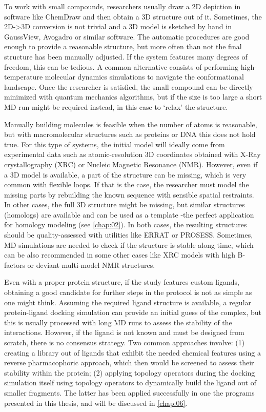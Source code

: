 To work with small compounds, researchers usually draw a 2D depiction in software like ChemDraw\cite{chemdraw} and then obtain a 3D structure out of it. Sometimes, the 2D->3D conversion is not trivial and a 3D model is sketched by hand in GaussView,\cite{gaussview} Avogadro\cite{avogadro} or similar software. The automatic procedures are good enough to provide a reasonable structure, but more often than not the final structure has been manually adjusted. If the system features many degrees of freedom, this can be tedious. A common alternative consists of performing high-temperature molecular dynamics simulations to navigate the conformational landscape. Once the researcher is satisfied, the small compound can be directly minimized with quantum mechanics algorithms, but if the size is too large a short MD run might be required instead, in this case to ‘relax’ the structure.

Manually building molecules is feasible when the number of atoms is reasonable, but with macromolecular structures such as proteins or DNA this does not hold true. For this type of systems, the initial model will ideally come from experimental data such as atomic-resolution 3D coordinates obtained with X-Ray crystallography (XRC) or Nucleic Magnetic Resonance (NMR). However, even if a 3D model is available, a part of the structure can be missing, which is very common with flexible loops. If that is the case, the researcher must model the missing parts by rebuilding the known sequence with sensible spatial restraints. In other cases, the full 3D structure might be missing, but similar structures (homologs) are available and can be used as a template -the perfect application for homology modeling (see \autoref{chap:02}). In both cases, the resulting structures should be quality-assessed with utilities like ERRAT\cite{errat} or PROSESS.\cite{prosess} Sometimes, MD simulations are needed to check if the structure is stable along time, which can be also recommended in some other cases like XRC models with high B-factors or deviant multi-model NMR structures.

Even with a proper protein structure, if the study features custom ligands, obtaining a good candidate for further steps in the protocol is not as simple as one might think. Assuming the required ligand structure is available, a regular protein-ligand docking simulation can provide an initial guess of the complex, but this is usually processed with long MD runs to assess the stability of the interactions. However, if the ligand is not known and must be designed from scratch, there is no consensus strategy. Two common approaches involve: (1) creating a library out of ligands that exhibit the needed chemical features using a reverse pharmacophoric approach, which then would be screened to assess their stability within the protein; (2) applying topology operators during the docking simulation itself using topology operators to dynamically build the ligand out of smaller fragments. The latter has been applied successfully in one the programs presented in this thesis, and will be discussed in \autoref{chap:06}.

